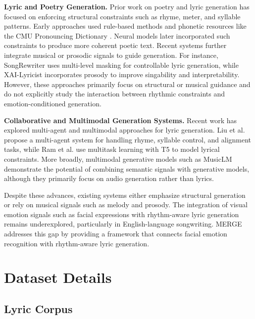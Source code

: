 \documentclass[11pt]{article}
\begin{document}
\textbf{Lyric and Poetry Generation.}
Prior work on poetry and lyric generation has focused on enforcing structural 
constraints such as rhyme, meter, and syllable patterns. Early approaches 
used rule-based methods and phonetic resources like the CMU Pronouncing 
Dictionary \cite{ghazvininejad2016generating, gonccalo2024automatic}. 
Neural models later incorporated such constraints to produce more coherent 
poetic text. Recent systems further integrate musical or prosodic signals 
to guide generation. For instance, SongRewriter \cite{sun2023songrewriter} 
uses multi-level masking for controllable lyric generation, while 
XAI-Lyricist \cite{liang2024xai} incorporates prosody to improve 
singability and interpretability. However, these approaches primarily 
focus on structural or musical guidance and do not explicitly study 
the interaction between rhythmic constraints and emotion-conditioned 
generation.

\textbf{Collaborative and Multimodal Generation Systems.}
Recent work has explored multi-agent and multimodal approaches for lyric 
generation. Liu et al. \cite{liu2024agent} propose a multi-agent system 
for handling rhyme, syllable control, and alignment tasks, while Ram 
et al. \cite{ram2021say} use multitask learning with T5 to model lyrical 
constraints. More broadly, multimodal generative models such as MusicLM 
\cite{huang2023musiclm} demonstrate the potential of combining semantic 
signals with generative models, although they primarily focus on audio 
generation rather than lyrics.

Despite these advances, existing systems either emphasize structural 
generation or rely on musical signals such as melody and prosody. The 
integration of visual emotion signals such as facial expressions with 
rhythm-aware lyric generation remains underexplored, particularly in 
English-language songwriting. MERGE addresses this gap by providing a framework that connects facial emotion recognition with 
rhythm-aware lyric generation.


\section{Dataset Details}

\subsection{Lyric Corpus}
\end{document}
